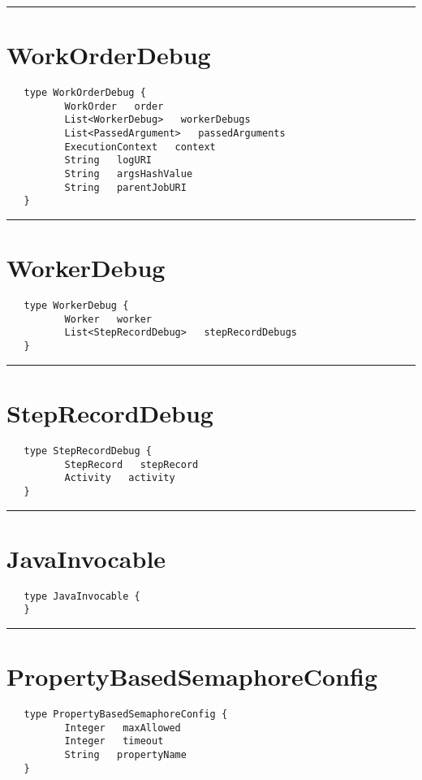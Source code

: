 \rule{15cm}{2pt}
\section{WorkOrderDebug}
\label{type:WorkOrderDebug}

\begin{verbatim}
   type WorkOrderDebug {
          WorkOrder   order
          List<WorkerDebug>   workerDebugs
          List<PassedArgument>   passedArguments
          ExecutionContext   context
          String   logURI
          String   argsHashValue
          String   parentJobURI
   }
\end{verbatim}

\rule{15cm}{2pt}
\section{WorkerDebug}
\label{type:WorkerDebug}

\begin{verbatim}
   type WorkerDebug {
          Worker   worker
          List<StepRecordDebug>   stepRecordDebugs
   }
\end{verbatim}

\rule{15cm}{2pt}
\section{StepRecordDebug}
\label{type:StepRecordDebug}

\begin{verbatim}
   type StepRecordDebug {
          StepRecord   stepRecord
          Activity   activity
   }
\end{verbatim}

\rule{15cm}{2pt}
\section{JavaInvocable}
\label{type:JavaInvocable}

\begin{verbatim}
   type JavaInvocable {
   }
\end{verbatim}

\rule{15cm}{2pt}
\section{PropertyBasedSemaphoreConfig}
\label{type:PropertyBasedSemaphoreConfig}

\begin{verbatim}
   type PropertyBasedSemaphoreConfig {
          Integer   maxAllowed
          Integer   timeout
          String   propertyName
   }
\end{verbatim}

